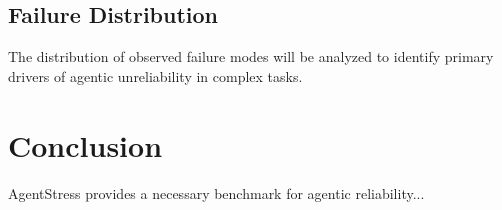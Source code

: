 \documentclass[11pt,a4paper]{article}
\begin{document}
\subsection{Failure Distribution}
The distribution of observed failure modes will be analyzed to identify primary drivers of agentic unreliability in complex tasks.



\section{Conclusion}
AgentStress provides a necessary benchmark for agentic reliability...



\end{document}
